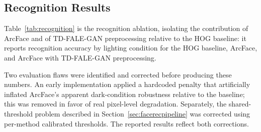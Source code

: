 \documentclass[conference]{IEEEtran}
\begin{document}
\subsection{Recognition Results}
Table~\ref{tab:recognition} is the recognition ablation,
isolating the contribution of ArcFace and of TD-FALE-GAN
preprocessing relative to the HOG baseline: it reports
recognition accuracy by lighting condition for the HOG baseline,
ArcFace, and ArcFace with TD-FALE-GAN preprocessing.

\begin{table}[!t]
\caption{Recognition Accuracy by Lighting (610 LFW identities,
1{,}643 probes)}
\label{tab:recognition}
\centering
{}
\end{table}

Two evaluation flaws were identified and corrected before
producing these numbers. An early implementation applied a
hardcoded penalty that artificially inflated ArcFace's apparent
dark-condition robustness relative to the baseline; this was
removed in favor of real pixel-level degradation. Separately, the
shared-threshold problem described in Section~\ref{sec:facerecpipeline} was corrected
using per-method calibrated thresholds. The reported results
reflect both corrections.
\end{document}
